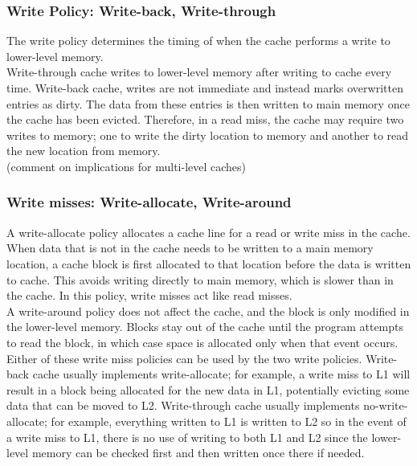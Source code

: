 \documentclass[a4paper, 12pt, oneside]{book}
\begin{document}
\subsubsection{Write Policy: Write-back, Write-through}

The write policy determines the timing of when the cache performs a write to lower-level memory.\\

Write-through cache writes to lower-level memory after writing to cache every time. Write-back cache, writes are not immediate and instead marks overwritten entries as dirty. The data from these entries is then written to main memory once the cache has been evicted. Therefore, in a read miss, the cache may require two writes to memory; one to write the dirty location to memory and another to read the new location from memory.\\

(comment on implications for multi-level caches)

\subsubsection{Write misses: Write-allocate, Write-around}

A write-allocate policy allocates a cache line for a read or write miss in the cache. When data that is not in the cache needs to be written to a main memory location, a cache block is first allocated to that location before the data is written to cache. This avoids writing directly to main memory, which is slower than in the cache. In this policy, write misses act like read misses.\\

A write-around policy does not affect the cache, and the block is only modified in the lower-level memory. Blocks stay out of the cache until the program attempts to read the block, in which case space is allocated only when that event occurs.\\

Either of these write miss policies can be used by the two write policies. Write-back cache usually implements write-allocate; for example, a write miss to L1 will result in a block being allocated for the new data in L1, potentially evicting some data that can be moved to L2. Write-through cache usually implements no-write-allocate; for example, everything written to L1 is written to L2 so in the event of a write miss to L1, there is no use of writing to both L1 and L2 since the lower-level memory can be checked first and then written once there if needed.
\end{document}
